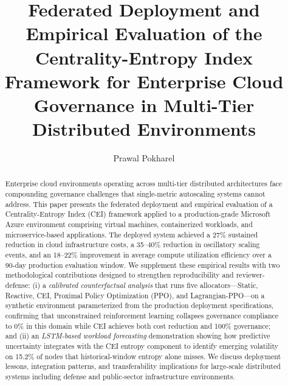 \documentclass[runningheads]{llncs}
\begin{document}
\title{Federated Deployment and Empirical Evaluation of the Centrality-Entropy Index Framework for Enterprise Cloud Governance in Multi-Tier Distributed Environments}


\author{Prawal Pokharel\orcidID{}}


\maketitle

\begin{abstract}
Enterprise cloud environments operating across multi-tier distributed architectures face compounding governance challenges that single-metric autoscaling systems cannot address. This paper presents the federated deployment and empirical evaluation of a Centrality-Entropy Index (CEI) framework applied to a production-grade Microsoft Azure environment comprising virtual machines, containerized workloads, and microservice-based applications. The deployed system achieved a 27\% sustained reduction in cloud infrastructure costs, a 35--40\% reduction in oscillatory scaling events, and an 18--22\% improvement in average compute utilization efficiency over a 90-day production evaluation window. We supplement these empirical results with two methodological contributions designed to strengthen reproducibility and reviewer-defense: (i) a \emph{calibrated counterfactual analysis} that runs five allocators---Static, Reactive, CEI, Proximal Policy Optimization (PPO), and Lagrangian-PPO---on a synthetic environment parameterized from the production deployment specifications, confirming that unconstrained reinforcement learning collapses governance compliance to 0\% in this domain while CEI achieves both cost reduction and 100\% governance; and (ii) an \emph{LSTM-based workload forecasting} demonstration showing how predictive uncertainty integrates with the CEI entropy component to identify emerging volatility on 15.2\% of nodes that historical-window entropy alone misses. We discuss deployment lessons, integration patterns, and transferability implications for large-scale distributed systems including defense and public-sector infrastructure environments.
\end{abstract}
\end{document}
